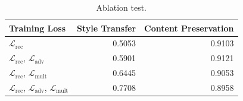 
\begin{table}[!t]
	\centering
	\begin{tabular}{| l | r | r |}
		\hline
		\textbf{Training Loss}                                                        & \textbf{Style Transfer} & \textbf{Content Preservation} \\
		\hline
		\hline
		$\mathcal{L}_\text{rec}$                                                      & 0.5053                  & 0.9103                        \\
		\hline
		$\mathcal{L}_\text{rec}$, $\mathcal{L}_\text{adv}$                            & 0.5901                  & 0.9121                        \\
		\hline
		$\mathcal{L}_\text{rec}$, $\mathcal{L}_\text{mult}$                           & 0.6445                  & 0.9053                        \\
		\hline
		$\mathcal{L}_\text{rec}$, $\mathcal{L}_\text{adv}$, $\mathcal{L}_\text{mult}$ & 0.7708                  & 0.8958                        \\
		\hline
	\end{tabular}
	\caption{Ablation test.}
	\label{tab:ablation-results}
\end{table}



